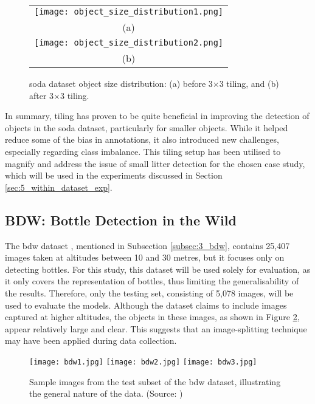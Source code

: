 
\begin{figure}[!ht]%
  \centering
  \begin{tabular}{c}
    \texttt{[image: object\_size\_distribution1.png]} \\
    \small (a) \\
    \addlinespace[1em]
    \texttt{[image: object\_size\_distribution2.png]} \\
    \small (b) \\
  \end{tabular}
  \caption{\gls{soda} dataset object size distribution: (a) before 3$\times$3 tiling, and (b) after 3$\times$3 tiling.}
  \label{fig:soda_object_size_distribution}
\end{figure}

In summary, tiling has proven to be quite beneficial in improving the detection of objects in the \gls{soda} dataset, particularly for smaller objects. While it helped reduce some of the bias in annotations, it also introduced new challenges, especially regarding class imbalance. This tiling setup has been utilised to magnify and address the issue of small litter detection for the chosen case study, which will be used in the experiments discussed in Section \ref{sec:5_within_dataset_exp}.


\subsection{BDW: Bottle Detection in the Wild}
\label{subsec:4_bdw}

The \gls{bdw} dataset \cite{bdwdataset}, mentioned in Subsection \ref{subsec:3_bdw}, contains 25,407 images taken at altitudes between 10 and 30 metres, but it focuses only on detecting bottles. For this study, this dataset will be used solely for evaluation, as it only covers the representation of bottles, thus limiting the generalisability of the results. Therefore, only the testing set, consisting of 5,078 images, will be used to evaluate the models. Although the dataset claims to include images captured at higher altitudes, the objects in these images, as shown in Figure \ref{fig:bdw_samples}, appear relatively large and clear. This suggests that an image-splitting technique may have been applied during data collection.

\begin{figure}[!htbp]
  \centering
  \texttt{[image: bdw1.jpg]}
  \hfill
  \texttt{[image: bdw2.jpg]}
  \hfill
  \texttt{[image: bdw3.jpg]}
  \caption{Sample images from the test subset of the \gls{bdw} dataset, illustrating the general nature of the data. (Source: \cite{bdwdataset})}
  \label{fig:bdw_samples}
\end{figure}


